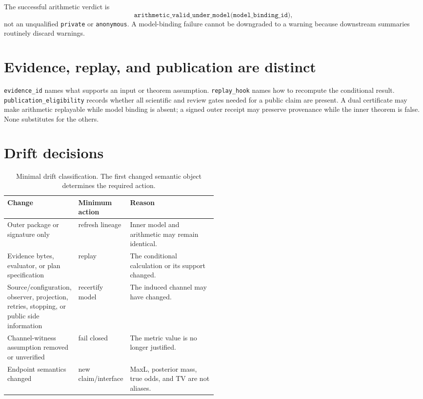 \documentclass[11pt]{article}
\begin{document}
The successful arithmetic verdict is
\[
\texttt{arithmetic\_valid\_under\_model(model\_binding\_id)},
\]
not an unqualified \texttt{private} or \texttt{anonymous}. A model-binding failure cannot be downgraded to a warning because downstream summaries routinely discard warnings.

\section{Evidence, replay, and publication are distinct}\label{sec:separation}
\texttt{evidence\_id} names what supports an input or theorem assumption. \texttt{replay\_hook} names how to recompute the conditional result. \texttt{publication\_eligibility} records whether all scientific and review gates needed for a public claim are present. A dual certificate may make arithmetic replayable while model binding is absent; a signed outer receipt may preserve provenance while the inner theorem is false. None substitutes for the others.

\section{Drift decisions}\label{sec:drift}
\begin{table}[t]
\centering
\small
\begin{tabularx}{0.96\linewidth}{@{}p{0.26\linewidth}p{0.24\linewidth}X@{}}
\toprule
Change & Minimum action & Reason\\
\midrule
Outer package or signature only & refresh lineage & Inner model and arithmetic may remain identical.\\
Evidence bytes, evaluator, or plan specification & replay & The conditional calculation or its support changed.\\
Source/configuration, observer, projection, retries, stopping, or public side information & recertify model & The induced channel may have changed.\\
Channel-witness assumption removed or unverified & fail closed & The metric value is no longer justified.\\
Endpoint semantics changed & new claim/interface & MaxL, posterior mass, true odds, and TV are not aliases.\\
\bottomrule
\end{tabularx}
\caption{Minimal drift classification. The first changed semantic object determines the required action.}
\label{tab:drift}
\end{table}
\end{document}
